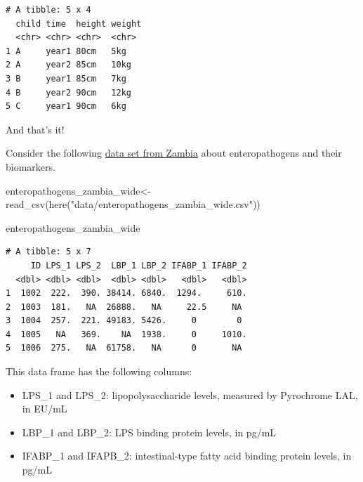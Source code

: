 \documentclass[
  letterpaper,
  DIV=11,
  numbers=noendperiod]{scrreprt}
\newenvironment{Shaded}{\begin{snugshade}}{\end{snugshade}}
\newcommand{\FunctionTok}[1]{\textcolor[rgb]{0.28,0.35,0.67}{#1}}
\newcommand{\NormalTok}[1]{\textcolor[rgb]{0.00,0.23,0.31}{#1}}
\newcommand{\OtherTok}[1]{\textcolor[rgb]{0.00,0.23,0.31}{#1}}
\newcommand{\StringTok}[1]{\textcolor[rgb]{0.13,0.47,0.30}{#1}}
\begin{document}
\begin{verbatim}
# A tibble: 5 x 4
  child time  height weight
  <chr> <chr> <chr>  <chr> 
1 A     year1 80cm   5kg   
2 A     year2 85cm   10kg  
3 B     year1 85cm   7kg   
4 B     year2 90cm   12kg  
5 C     year1 90cm   6kg   
\end{verbatim}

And that's it!

\begin{tcolorbox}[enhanced jigsaw, colframe=quarto-callout-tip-color-frame, rightrule=.15mm, opacityback=0, breakable, coltitle=black, colbacktitle=quarto-callout-tip-color!10!white, bottomrule=.15mm, leftrule=.75mm, toprule=.15mm, arc=.35mm, bottomtitle=1mm, colback=white, left=2mm, opacitybacktitle=0.6, titlerule=0mm, title=\textcolor{quarto-callout-tip-color}{\faLightbulb}\hspace{0.5em}{Practice}, toptitle=1mm]

Consider the following \href{https://zenodo.org/record/4571669}{data set
from Zambia} about enteropathogens and their biomarkers.

\begin{Shaded}
\begin{Highlighting}[]
\NormalTok{enteropathogens\_zambia\_wide}\OtherTok{\textless{}{-}} \FunctionTok{read\_csv}\NormalTok{(}\FunctionTok{here}\NormalTok{(}\StringTok{"data/enteropathogens\_zambia\_wide.csv"}\NormalTok{))}

\NormalTok{enteropathogens\_zambia\_wide}
\end{Highlighting}
\end{Shaded}

\begin{verbatim}
# A tibble: 5 x 7
     ID LPS_1 LPS_2  LBP_1 LBP_2 IFABP_1 IFABP_2
  <dbl> <dbl> <dbl>  <dbl> <dbl>   <dbl>   <dbl>
1  1002  222.  390. 38414. 6840.  1294.     610.
2  1003  181.   NA  26888.   NA     22.5     NA 
3  1004  257.  221. 49183. 5426.     0        0 
4  1005   NA   369.    NA  1938.     0     1010.
5  1006  275.   NA  61758.   NA      0       NA 
\end{verbatim}

This data frame has the following columns:

\begin{itemize}
\item
  LPS\_1 and LPS\_2: lipopolysaccharide levels, measured by Pyrochrome
  LAL, in EU/mL
\item
  LBP\_1 and LBP\_2: LPS binding protein levels, in pg/mL
\item
  IFABP\_1 and IFAPB\_2: intestinal-type fatty acid binding protein
  levels, in pg/mL
\end{itemize}


\end{tcolorbox}
\end{document}
